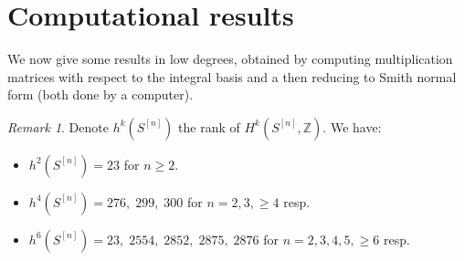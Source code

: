 \documentclass{amsart}
\newcommand{\hilb}[1]{^{[#1]}}
\newcommand{\IZ}{\mathbb{Z}}
\theoremstyle{plain}
\theoremstyle{definition}
\theoremstyle{remark}
\newtheorem{remark}[theorem]{Remark}
\begin{document}
\section{Computational results} 
We now give some results in low degrees, obtained by computing multiplication matrices with respect to the integral basis and a then reducing to Smith normal form (both done by a computer).
\begin{remark}
Denote $h^k(S\hilb{n})$ the rank of $H^k(S\hilb{n},\IZ)$. We have:
\begin{itemize}
\item $h^2(S\hilb{n}) = 23 $ for $n\geq 2$.
\item $h^4(S\hilb{n}) = 276,\; 299,\; 300$ for $n=2,3, \geq 4$ resp.
\item $h^6(S\hilb{n}) = 23,\; 2554,\; 2852,\; 2875,\; 2876$ for $n=2,3,4,5,\geq6$ resp.
\end{itemize}
\end{remark}
\end{document}
